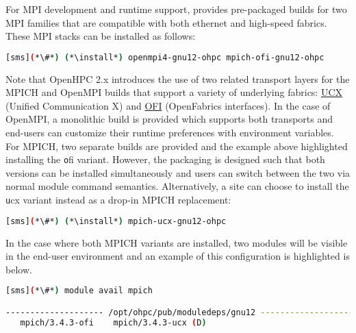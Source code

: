 For MPI development and runtime support, \OHPC{} provides pre-packaged builds
for two MPI families that are compatible with both ethernet and high-speed
fabrics.  These MPI stacks can be installed as follows:

\begin{lstlisting}[language=bash]
[sms](*\#*) (*\install*) openmpi4-gnu12-ohpc mpich-ofi-gnu12-ohpc
\end{lstlisting}

Note that OpenHPC 2.x introduces the use of two related transport layers for
the MPICH and OpenMPI builds that support a variety of underlying
fabrics: \href{https://www.openucx.org}{UCX} (Unified Communication X)
and \href{https://ofiwg.github.io/libfabric/}{OFI} (OpenFabrics interfaces).
In the case of OpenMPI, a monolithic build is provided which supports both
transports and end-users can customize their runtime preferences with
environment variables. For MPICH, two separate builds are provided and the
example above highlighted installing the {\texttt ofi} variant.  However, the
packaging is designed such that both versions can be installed simultaneously
and users can switch between the two via normal module command
semantics. Alternatively, a site can choose to install the {\texttt ucx} variant
instead as a drop-in MPICH replacement:

\begin{lstlisting}[language=bash]
[sms](*\#*) (*\install*) mpich-ucx-gnu12-ohpc
\end{lstlisting}

In the case where both MPICH variants are installed, two modules will be
visible in the end-user environment and an example of this configuration is
highlighted is below. 

\begin{lstlisting}[language=bash]
[sms](*\#*) module avail mpich

-------------------- /opt/ohpc/pub/moduledeps/gnu12 ---------------------
   mpich/3.4.3-ofi    mpich/3.4.3-ucx (D)
\end{lstlisting}





